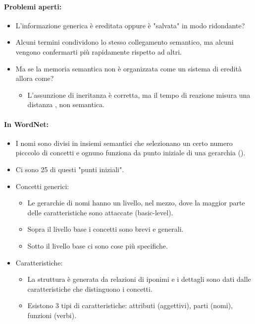 \paragraph{Problemi aperti:}

\begin{itemize}
  \item L'informazione generica è ereditata oppure è "salvata" in modo ridondante?
  \item Alcuni termini condividono lo stesso collegamento semantico, ma alcuni vengono confermarti più rapidamente rispetto ad altri. 
  \item Ma se la memoria semantica non è organizzata come un sistema di eredità allora come? 
    \begin{itemize}
      \item L'assunzione di ineritanza è corretta, ma il tempo di reazione misura una distanza , non semantica.
    \end{itemize}
\end{itemize}

\paragraph{In WordNet:}

\begin{itemize}
  \item I nomi sono divisi in insiemi semantici che selezionano un certo numero picccolo di concetti e ognuno funziona da punto iniziale di una gerarchia (). 
  \item Ci sono 25 di questi "punti iniziali".
  \item Concetti generici: 
    \begin{itemize}
      \item Le gerarchie di nomi hanno un livello, nel mezzo, dove la maggior parte delle caratteristiche sono attaccate (basic-level). 
      \item Sopra il livello base i concetti sono brevi e generali. 
      \item Sotto il livello base ci sono cose più specifiche.
    \end{itemize}
  \item Caratteristiche: 
    \begin{itemize}
      \item La struttura è generata da relazioni di iponimi e i dettagli sono dati dalle caratteristiche che distinguono i concetti. 
      \item Esistono 3 tipi di caratteristiche: attributi (aggettivi), parti (nomi), funzioni (verbi). 
    \end{itemize}
\end{itemize}

